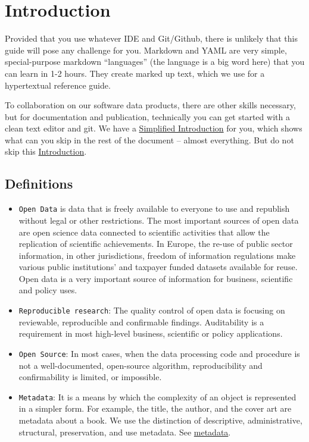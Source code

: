 \documentclass[
  fontsize=13pt,
  english,
  a4paper,
  openany, a4paper, oneside]{book}
\begin{document}
\hypertarget{intro}{%
\chapter{Introduction}\label{intro}}

Provided that you use whatever IDE and Git/Github, there is unlikely that this guide will pose any challenge for you. Markdown and YAML are very simple, special-purpose markdown ``languages'' (the language is a big word here) that you can learn in 1-2 hours. They create marked up text, which we use for a hypertextual reference guide.

To collaboration on our software data products, there are other skills necessary, but for documentation and publication, technically you can get started with a clean text editor and git. We have a \protect\hyperlink{simple-intro}{Simplified Introduction} for you, which shows what can you skip in the rest of the document -- almost everything. But do not skip this \protect\hyperlink{intro}{Introduction}.

\hypertarget{definitions}{%
\section{Definitions}\label{definitions}}

\begin{itemize}
\item
  \texttt{Open\ Data} is data that is freely available to everyone to use and republish without legal or other restrictions. The most important sources of open data are open science data connected to scientific activities that allow the replication of scientific achievements. In Europe, the re-use of public sector information, in other jurisdictions, freedom of information regulations make various public institutions' and taxpayer funded datasets available for reuse. Open data is a very important source of information for business, scientific and policy uses.
\item
  \texttt{Reproducible\ research}: The quality control of open data is focusing on reviewable, reproducible and confirmable findings. Auditability is a requirement in most high-level business, scientific or policy applications.
\item
  \texttt{Open\ Source}: In most cases, when the data processing code and procedure is not a well-documented, open-source algorithm, reproducibility and confirmability is limited, or impossible.
\item
  \texttt{Metadata}: It is a means by which the complexity of an object is represented in a simpler form. For example, the title, the author, and the cover art are metadata about a book. We use the distinction of descriptive, administrative, structural, preservation, and use metadata. See \protect\hyperlink{metadata}{metadata}.
\end{itemize}
\end{document}

